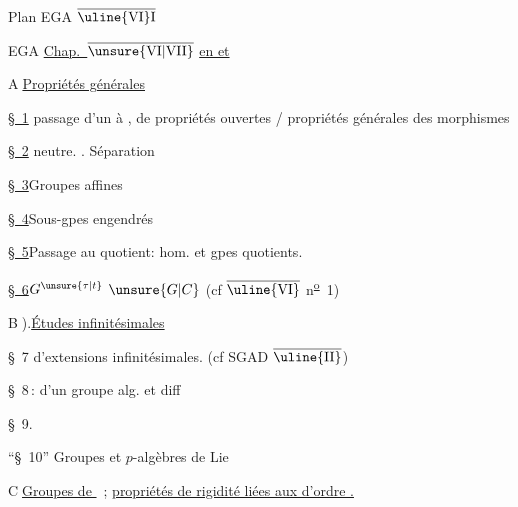 \noindent\hfill Plan EGA $\overline{\text{\uline{VI}I}}$

\clearpage
{}
\noindent EGA \uline{Chap.\ $\overline{\mathrm{\unsure{VI|VII}}}$}\qquad
\uline{ en  et  }

\noindent\textcircled{A}\quad \uline{Propriétés générales}

\noindent\uline{\S~1}\quad {}  passage d'un  à , de propriétés ouvertes / propriétés générales des morphismes

\noindent\uline{\S~2}\quad {} neutre. . Séparation

\noindent\uline{\S~3}\quad Groupes affines

\reversemarginpar
\noindent{}\uline{\S~4}\quad Sous-gpes engendrés
\normalmarginpar

\noindent\uline{\S~5}\quad Passage au quotient:  hom. et gpes quotients.

\noindent\uline{\S~6}\quad $G^{\unsure{\tau|t}}$  $\unsure{G|C}$  (cf  $\overline{\text{\uline{VI}}}$ n\textsuperscript{\uline{o}}~1)

\noindent\textcircled{B}).\quad \uline{Études infinitésimales}

\noindent\S~7\quad {} d'extensions infinitésimales. (cf SGAD $\overline{\text{\uline{II}}}$)

\noindent\S~8\,: \quad {} d'un groupe alg. et  diff 

\noindent\S~9.\quad {}

\noindent``\S~10''\quad {} Groupes  et $p$-algèbres de Lie

\noindent{}

\noindent{}

\noindent\textcircled{C}\quad \uline{Groupes de  }\ ; \uline{propriétés de rigidité liées aux  d'ordre .}

